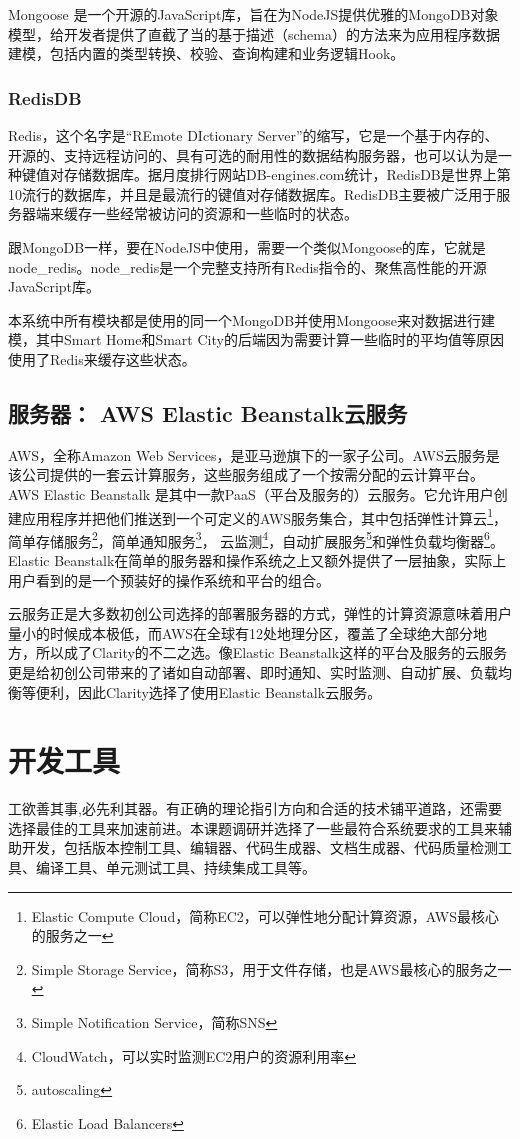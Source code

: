 Mongoose 是一个开源的JavaScript库，旨在为NodeJS提供优雅的MongoDB对象模型，给开发者提供了直截了当的基于描述（schema）的方法来为应用程序数据建模，包括内置的类型转换、校验、查询构建和业务逻辑Hook。
\subsubsection{RedisDB}
Redis，这个名字是“REmote DIctionary Server”的缩写，它是一个基于内存的、开源的、支持远程访问的、具有可选的耐用性的数据结构服务器，也可以认为是一种键值对存储数据库。据月度排行网站DB-engines.com统计，RedisDB是世界上第10流行的数据库，并且是最流行的键值对存储数据库。RedisDB主要被广泛用于服务器端来缓存一些经常被访问的资源和一些临时的状态。

跟MongoDB一样，要在NodeJS中使用，需要一个类似Mongoose的库，它就是node\_redis。node\_redis是一个完整支持所有Redis指令的、聚焦高性能的开源JavaScript库。

本系统中所有模块都是使用的同一个MongoDB并使用Mongoose来对数据进行建模，其中Smart Home和Smart City的后端因为需要计算一些临时的平均值等原因使用了Redis来缓存这些状态。

\subsection{服务器： AWS Elastic Beanstalk云服务}
AWS，全称Amazon Web Services，是亚马逊旗下的一家子公司。AWS云服务是该公司提供的一套云计算服务，这些服务组成了一个按需分配的云计算平台。AWS Elastic Beanstalk 是其中一款PaaS（平台及服务的）云服务。它允许用户创建应用程序并把他们推送到一个可定义的AWS服务集合，其中包括弹性计算云\footnote{Elastic Compute Cloud，简称EC2，可以弹性地分配计算资源，AWS最核心的服务之一}，简单存储服务\footnote{Simple Storage Service，简称S3，用于文件存储，也是AWS最核心的服务之一}，简单通知服务\footnote{Simple Notification Service，简称SNS}， 云监测\footnote{CloudWatch，可以实时监测EC2用户的资源利用率}，自动扩展服务\footnote{autoscaling}和弹性负载均衡器\footnote{Elastic Load Balancers}。Elastic Beanstalk在简单的服务器和操作系统之上又额外提供了一层抽象，实际上用户看到的是一个预装好的操作系统和平台的组合。

云服务正是大多数初创公司选择的部署服务器的方式，弹性的计算资源意味着用户量小的时候成本极低，而AWS在全球有12处地理分区，覆盖了全球绝大部分地方，所以成了Clarity的不二之选。像Elastic Beanstalk这样的平台及服务的云服务更是给初创公司带来的了诸如自动部署、即时通知、实时监测、自动扩展、负载均衡等便利，因此Clarity选择了使用Elastic Beanstalk云服务。

\section{开发工具}
工欲善其事,必先利其器。有正确的理论指引方向和合适的技术铺平道路，还需要选择最佳的工具来加速前进。本课题调研并选择了一些最符合系统要求的工具来辅助开发，包括版本控制工具、编辑器、代码生成器、文档生成器、代码质量检测工具、编译工具、单元测试工具、持续集成工具等。
